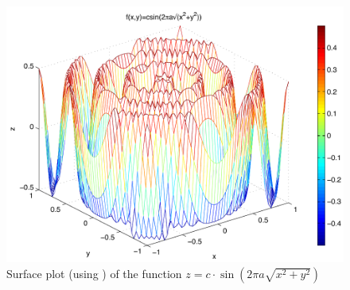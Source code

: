 \begin{figure}[h!]
	\myfloatalign
	\includegraphics[width=\linewidth]{Graphics/Unit02/mesh}
	\caption{Surface plot (using ) of the function $z=c \cdot \sin( 2\pi a \sqrt{x^2+y^2})$}
	\label{fig:mesh}
\end{figure}

